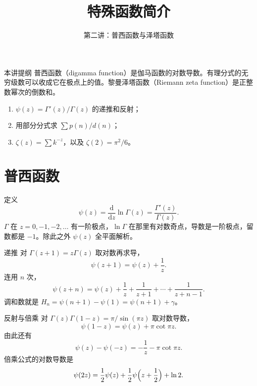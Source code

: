 \documentclass[fontset=windows, chinese, 10pt, xcolor=dvipsnames]{beamer}
\title{特殊函数简介}
\subtitle{第二讲：普西函数与泽塔函数}
\begin{document}
\begin{frame}
  \titlepage
\end{frame}

\begin{frame}{本讲提纲}
  普西函数（digamma function）是伽马函数的对数导数。有理分式的无穷级数可以收成它在极点上的值。黎曼泽塔函数（Riemann zeta function）是正整数幂次的倒数和。
  \begin{enumerate}
    \item $\psi(z)=\Gamma'(z)/\Gamma(z)$ 的递推和反射；
    \item 用部分分式求 $\sum p(n)/d(n)$；
    \item $\zeta(z)=\sum k^{-z}$，以及 $\zeta(2)=\pi^2/6$。
  \end{enumerate}
\end{frame}

\section{普西函数}

\begin{frame}{定义}
  \begin{equation*}
    \boxed{\displaystyle
      \psi(z)=\frac{\mathrm{d}}{\mathrm{d}z}\ln\Gamma(z)
      =\frac{\Gamma'(z)}{\Gamma(z)}.}
  \end{equation*}
  $\Gamma$ 在 $z=0,-1,-2,\ldots$ 有一阶极点，$\ln\Gamma$ 在那里有对数奇点，导数是一阶极点，留数都是 $-1$。除此之外 $\psi(z)$ 全平面解析。
\end{frame}

\begin{frame}{递推}
  对 $\Gamma(z+1)=z\Gamma(z)$ 取对数再求导，
  \[
    \psi(z+1)=\psi(z)+\frac{1}{z}.
  \]
  连用 $n$ 次，
  \begin{equation*}
    \psi(z+n)
    =\psi(z)+\frac{1}{z}+\frac{1}{z+1}+\cdots+\frac{1}{z+n-1}.
  \end{equation*}
  调和数就是 $H_n=\psi(n+1)-\psi(1)=\psi(n+1)+\gamma$。
\end{frame}

\begin{frame}{反射与倍乘}
  对 $\Gamma(z)\Gamma(1-z)=\pi/\sin(\pi z)$ 取对数导数，
  \begin{equation*}
    \psi(1-z)=\psi(z)+\pi\cot\pi z.
  \end{equation*}
  由此还有
  \[
    \psi(z)-\psi(-z)=-\frac{1}{z}-\pi\cot\pi z.
  \]
  倍乘公式的对数导数是
  \[
    \psi(2z)=\frac12\psi(z)+\frac12\psi\Bigl(z+\frac12\Bigr)+\ln 2.
  \]
\end{frame}
\end{document}
